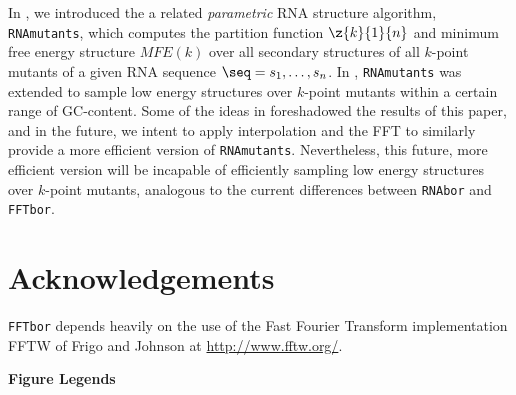 In \cite{CloWalBehSte05,Waldispuhl.pcb08}, we introduced the a related
{\em parametric} RNA structure algorithm, {\tt RNAmutants}, which computes
the partition function $\z{k}{1}{n}$ and minimum free energy
structure $MFE(k)$ over all secondary structures of all $k$-point mutants
of a given RNA sequence $\seq=s_1,\ldots,s_n$. In  \cite{WaPo2011},
{\tt RNAmutants} was extended to sample low energy structures over
$k$-point mutants within a certain range of GC-content. Some of the ideas
in \cite{WaPo2011} foreshadowed the results of this paper, and in the
future, we intent to apply interpolation and the FFT to similarly provide a
more efficient version of {\tt RNAmutants}. Nevertheless, this future,
more efficient version will be incapable of efficiently sampling low
energy structures over $k$-point mutants, analogous to the current
differences between {\tt RNAbor} and {\tt FFTbor}.


\section*{Acknowledgements}

{\tt FFTbor} depends heavily on the
use of the Fast Fourier Transform implementation FFTW of Frigo and Johnson
\cite{FFTW05} at \url{http://www.fftw.org/}.






\newpage
%

%


\hfill\break
\hfill\break
\newpage

\noindent
{\bf\Large Figure Legends}



